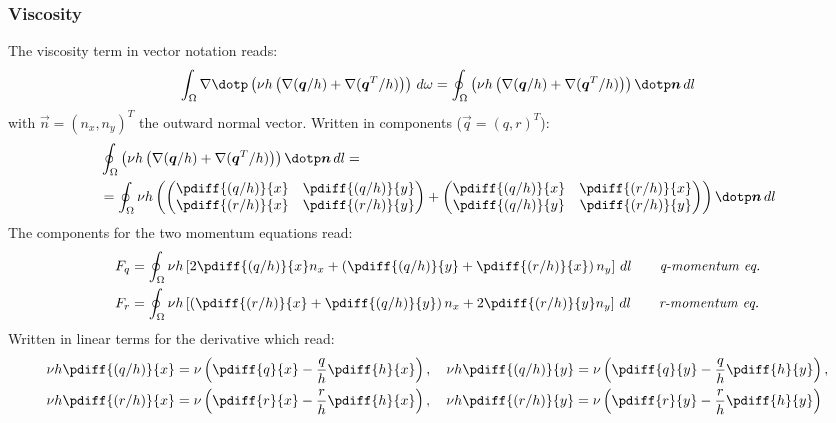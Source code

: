 \subsubsection{Viscosity}
The viscosity term in vector notation reads:
\begin{align}
    \int_\Omega \nabla \dotp \left( \nu h \left(  \nabla (\vec{q}/h) + \nabla (\vec{q}^T/h) \right) \right)\, d\omega =
    \oint_{\Omega}  \left( \nu h \left( \nabla (\vec{q}/h) + \nabla (\vec{q}^T/h) \right) \right) \dotp \vec{n}\, dl
\end{align}
with $\vec{n} = (n_x, n_y)^T$ the outward normal vector.
Written in components ($\vec{q} = (q, r)^T$):
\begin{align}
    &\oint_{\Omega}  \left( \nu h \left( \nabla (\vec{q}/h) + \nabla (\vec{q}^T/h) \right) \right) \dotp \vec{n}\, dl =
    \\
    & =
    \oint_{\Omega} \nu h
    \left(
    \begin{pmatrix}
    \pdiff{(q/h)}{x} & \pdiff{(q/h)}{y}
    \\
    \pdiff{(r/h)}{x} & \pdiff{(r/h)}{y}
    \end{pmatrix}
    +
    \begin{pmatrix}
    \pdiff{(q/h)}{x} & \pdiff{(r/h)}{x}
    \\
    \pdiff{(q/h)}{y} & \pdiff{(r/h)}{y}
   \end{pmatrix}
   \right)
    \dotp \vec{n}\, dl
\end{align}
The components for the two momentum equations read:
\begin{align}
    F_q
    & = \oint_{\Omega} \nu h
    \left[ 2\pdiff{(q/h)}{x} n_x
    + \left(\pdiff{(q/h)}{y} + \pdiff{(r/h)}{x}\right)n_y \right] \, dl
    \qquad \textit{q-momentum eq.}
    \\
    F_r
    & = \oint_{\Omega}  \nu h
    \left[ \left(\pdiff{(r/h)}{x} + \pdiff{(q/h)}{y}\right)n_x
    + 2\pdiff{(r/h)}{y} n_y \right] \, dl
    \qquad \textit{r-momentum eq.}
\end{align}
Written in linear terms for the derivative which read:
\begin{align}
    & \nu h \pdiff{(q/h)}{x} = \nu \left( \pdiff{q}{x} - \frac{q}{h}\pdiff{h}{x} \right),
    \quad \nu h \pdiff{(q/h)}{y} = \nu \left( \pdiff{q}{y} - \frac{q}{h}\pdiff{h}{y} \right),
    \\
    & \nu h \pdiff{(r/h)}{x} = \nu \left( \pdiff{r}{x} - \frac{r}{h}\pdiff{h}{x} \right),
    \quad \nu h \pdiff{(r/h)}{y} = \nu \left( \pdiff{r}{y} - \frac{r}{h}\pdiff{h}{y} \right)
\end{align}
